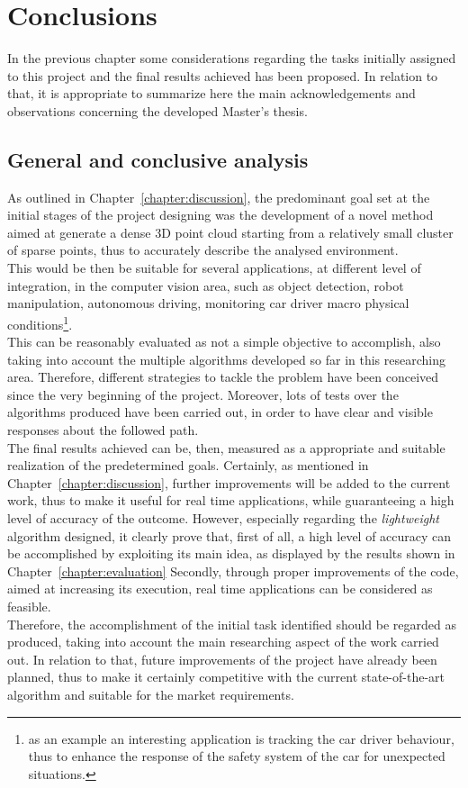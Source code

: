\chapter{Conclusions}
\label{chapter:conclusions}

In the previous chapter some considerations regarding the tasks initially assigned to this project and the final results achieved has been proposed.
In relation to that, it is appropriate to summarize here the main acknowledgements and observations concerning the developed Master's thesis.

\section{General and conclusive analysis}
\label{section:general-final-analysis}

As outlined in Chapter~\ref{chapter:discussion}, the predominant goal set at  the initial stages of the project designing was the development of a novel method aimed at generate a dense 3D point cloud starting from a relatively small cluster of sparse points, thus to accurately describe the analysed environment.\\
This would be then be suitable for several applications, at different level of integration, in the computer vision area, such as object detection, robot manipulation, autonomous driving, monitoring car driver macro physical conditions\footnote{as an example an interesting application is tracking the car driver behaviour, thus to enhance the response of the safety system of the car for unexpected situations.}.\\
This can be reasonably evaluated as not a simple objective to accomplish, also taking into account the multiple algorithms developed so far in this researching area.
Therefore, different strategies to tackle the problem have been conceived since the very beginning of the project. 
Moreover, lots of tests over the algorithms produced have been carried out, in order to have clear and visible responses about the followed path.\\
The final results achieved can be, then, measured as a appropriate and suitable realization of the predetermined goals.
Certainly, as mentioned in Chapter~\ref{chapter:discussion}, further improvements will be added to the current work, thus to make it useful for real time applications, while guaranteeing a high level of accuracy of the outcome.
However, especially regarding the \textit{lightweight} algorithm designed, it clearly prove that, first of all, a high level of accuracy can be accomplished by exploiting its main idea, as displayed by the results shown in Chapter~\ref{chapter:evaluation}
Secondly, through proper improvements of the code, aimed at increasing its execution, real time applications can be considered as feasible.\\
Therefore, the accomplishment of the initial task identified should be regarded as produced, taking into account the main researching aspect of the work carried out.
In relation to that, future improvements of the project have already been planned, thus to make it certainly competitive with the current state-of-the-art algorithm and suitable for the market requirements.

